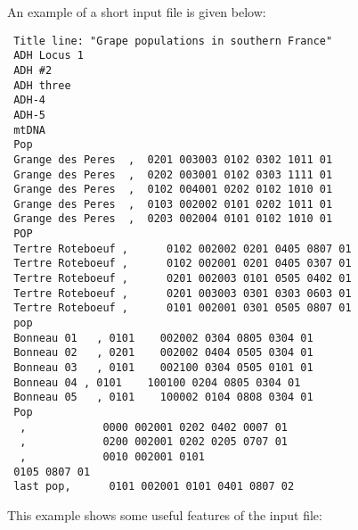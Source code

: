 \documentclass[12pt,]{book}
\begin{document}
An example of a short input file is given below:

\begin{verbatim}
 Title line: "Grape populations in southern France"
 ADH Locus 1
 ADH #2
 ADH three
 ADH-4
 ADH-5
 mtDNA
 Pop
 Grange des Peres  ,  0201 003003 0102 0302 1011 01
 Grange des Peres  ,  0202 003001 0102 0303 1111 01
 Grange des Peres  ,  0102 004001 0202 0102 1010 01
 Grange des Peres  ,  0103 002002 0101 0202 1011 01
 Grange des Peres  ,  0203 002004 0101 0102 1010 01
 POP
 Tertre Roteboeuf ,      0102 002002 0201 0405 0807 01
 Tertre Roteboeuf ,      0102 002001 0201 0405 0307 01
 Tertre Roteboeuf ,      0201 002003 0101 0505 0402 01
 Tertre Roteboeuf ,      0201 003003 0301 0303 0603 01
 Tertre Roteboeuf ,      0101 002001 0301 0505 0807 01
 pop
 Bonneau 01   , 0101    002002 0304 0805 0304 01
 Bonneau 02   , 0201    002002 0404 0505 0304 01
 Bonneau 03   , 0101    002100 0304 0505 0101 01
 Bonneau 04 , 0101    100100 0204 0805 0304 01
 Bonneau 05   , 0101    100002 0104 0808 0304 01
 Pop
  ,            0000 002001 0202 0402 0007 01
  ,            0200 002001 0202 0205 0707 01
  ,            0010 002001 0101
 0105 0807 01
 last pop,      0101 002001 0101 0401 0807 02
\end{verbatim}

This example shows some useful features of the input file:
\end{document}
